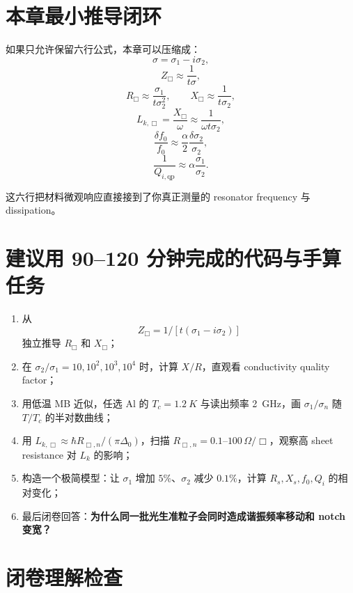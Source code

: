 \documentclass[11pt,a4paper,openany]{ctexrep}
\newcommand{\qp}{\mathrm{qp}}
\begin{document}
\section{本章最小推导闭环}

如果只允许保留六行公式，本章可以压缩成：
\[
\sigma=\sigma_1-i\sigma_2,
\]
\[
Z_{\Box}\approx\frac{1}{t\sigma},
\]
\[
R_{\Box}\approx\frac{\sigma_1}{t\sigma_2^2},
\qquad
X_{\Box}\approx\frac{1}{t\sigma_2},
\]
\[
L_{k,\Box}=\frac{X_{\Box}}{\omega}
\approx\frac{1}{\omega t\sigma_2},
\]
\[
\frac{\delta f_0}{f_0}
\approx
\frac{\alpha}{2}\frac{\delta\sigma_2}{\sigma_2},
\]
\[
\frac{1}{Q_{i,\qp}}
\approx
\alpha\frac{\sigma_1}{\sigma_2}.
\]

这六行把材料微观响应直接接到了你真正测量的 resonator frequency 与 dissipation。

\section{建议用 90--120 分钟完成的代码与手算任务}

\begin{enumerate}
  \item 从
  \[
  Z_{\Box}=1/[t(\sigma_1-i\sigma_2)]
  \]
  独立推导 $R_{\Box}$ 和 $X_{\Box}$；
  \item 在 $\sigma_2/\sigma_1=10,10^2,10^3,10^4$ 时，计算 $X/R$，直观看 conductivity quality factor；
  \item 用低温 MB 近似，任选 Al 的 $T_c=\SI{1.2}{K}$ 与读出频率 \SI{2}{GHz}，画 $\sigma_1/\sigma_n$ 随 $T/T_c$ 的半对数曲线；
  \item 用 $L_{k,\Box}\approx\hbar R_{\Box,n}/(\pi\Delta_0)$，扫描 $R_{\Box,n}=0.1$--$100\,\Omega/\Box$，观察高 sheet resistance 对 $L_k$ 的影响；
  \item 构造一个极简模型：让 $\sigma_1$ 增加 $5\%$、$\sigma_2$ 减少 $0.1\%$，计算 $R_s,X_s,f_0,Q_i$ 的相对变化；
  \item 最后闭卷回答：\textbf{为什么同一批光生准粒子会同时造成谐振频率移动和 notch 变宽？}
\end{enumerate}

\section{闭卷理解检查}
\end{document}
